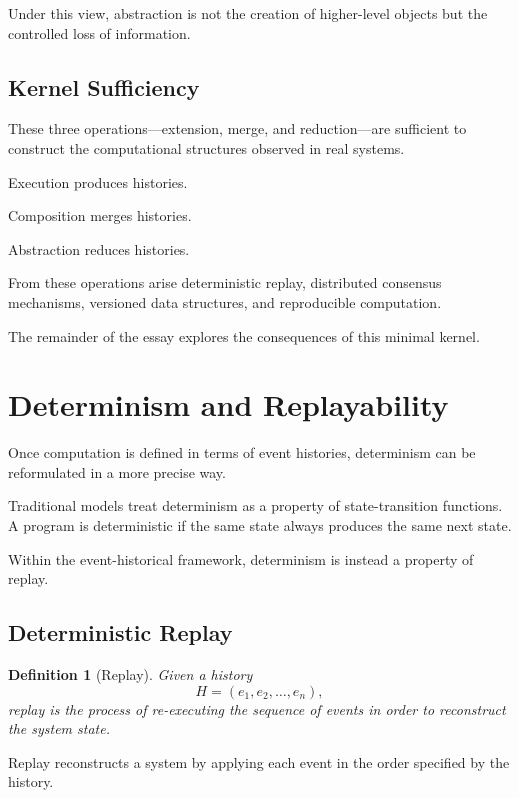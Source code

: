 \documentclass[12pt]{article}
\newtheorem{definition}{Definition}
\begin{document}
Under this view, abstraction is not the creation of higher-level
objects but the controlled loss of information.

\subsection{Kernel Sufficiency}

These three operations—extension, merge, and reduction—are
sufficient to construct the computational structures
observed in real systems.

Execution produces histories.

Composition merges histories.

Abstraction reduces histories.

From these operations arise deterministic replay,
distributed consensus mechanisms,
versioned data structures,
and reproducible computation.

The remainder of the essay explores the consequences
of this minimal kernel.


\section{Determinism and Replayability}

Once computation is defined in terms of event histories,
determinism can be reformulated in a more precise way.

Traditional models treat determinism as a property of
state-transition functions. A program is deterministic
if the same state always produces the same next state.

Within the event-historical framework, determinism
is instead a property of replay.

\subsection{Deterministic Replay}

\begin{definition}[Replay]
Given a history
\[
H = (e_1, e_2, \dots, e_n),
\]
replay is the process of re-executing the sequence
of events in order to reconstruct the system state.
\end{definition}

Replay reconstructs a system by applying each event
in the order specified by the history.
\end{document}
